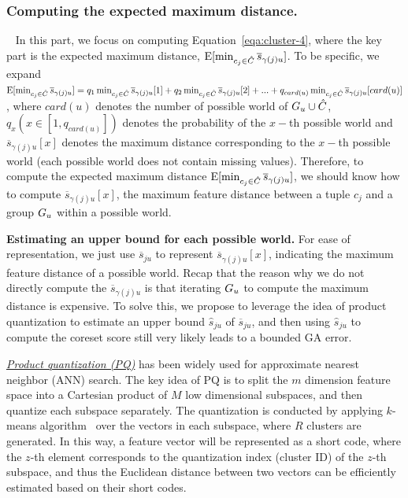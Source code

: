  


\subsubsection{Computing the expected maximum distance.}~\label{subsec:pq} In this part, we focus on computing Equation~\ref{eqa:cluster-4}, where the key part is the expected maximum distance, \ie $\mathrm{E}[\min_{c_j\in \hat{C}}\overline{s}_{\gamma(j)u}]$. To be specific, we expand $\mathrm{E}[\min_{c_j\in \hat{C}}\overline{s}_{\gamma(j)u}] = q_1\min_{c_j\in \hat{C}}\overline{s}_{\gamma(j)u}[1] + q_2\min_{c_j\in \hat{C}}\overline{s}_{\gamma(j)u}[2] + ... +q_{card(u)}\min_{c_j\in \hat{C}}\overline{s}_{\gamma(j)u}[card(u)]$, where $card(u)$ denotes the number of possible world of $G_u \cup \hat{C}$, $q_x    (x\in [1, q_{card(u)}])$ denotes the probability of the $x-$th possible world and  $\overline{s}_{\gamma(j)u}[x]$ denotes the maximum distance  corresponding to the $x-$th possible world (each possible world does not contain missing values). 
%
%
%
Therefore, to compute the expected maximum distance $\mathrm{E}[\min_{c_j\in \hat{C}}\overline{s}_{\gamma(j)u}]$, we should know how to compute $\overline{s}_{\gamma(j)u}[x]$, \ie the  maximum feature distance between a tuple $c_j$ and a group $G_u$ within a possible world.

\noindent \textbf{Estimating an upper bound for each possible world.} 
For ease of representation, we just use $\overline{s}_{ju}$ to represent  $\overline{s}_{\gamma(j)u}[x]$, indicating the maximum feature distance of a possible world.
%
%
 Recap that the reason why we do not directly compute the  $\overline{s}_{\gamma(j)u}$ is that iterating $G_u$ to compute the maximum distance is expensive.
  To solve this, we propose to leverage the idea of product quantization  to estimate an upper bound $\hat{s}_{ju}$ of $\overline{s}_{ju}$, and then using $\hat{s}_{ju}$ to compute the coreset score still very likely leads to a bounded GA error.
  
  \noindent  \underline{\textit{Product quantization (PQ)}}  has been widely used for approximate nearest neighbor (ANN) search.  The key idea of PQ is to split the $m$ dimension feature space into a Cartesian product of $M$ low dimensional subspaces, and then quantize each subspace separately.  
 The quantization is conducted by applying $k$-means algorithm~\cite{hartigan1979algorithm} over the vectors in each subspace, where $R$ clusters are generated.  
  In this way, a feature vector will be represented as a short code, where the $z$-th element corresponds to the quantization index (\ie cluster ID) of the $z$-th subspace, and thus the Euclidean distance between two vectors can be efficiently estimated based on their short codes. 
  
